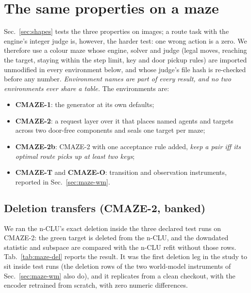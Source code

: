 \documentclass{article} %
\begin{document}
\section{The same properties on a maze}
\label{sec:maze}

Sec.~\ref{sec:shapes} tests the three properties on images; a route task with the engine's integer judge is, however, the harder test: one wrong action is a zero. We therefore use a colour maze whose engine, solver and judge (legal
moves, reaching the target, staying within the step limit, key and door pickup rules) are imported
unmodified in every environment below, and whose judge's file hash is re-checked before any
number. %
\emph{Environment names are part of every result, and no two environments ever share a
table.} The environments are:
\begin{itemize}[leftmargin=*,nosep]
\item \textbf{CMAZE-1}: the generator at its own defaults;
\item \textbf{CMAZE-2}: a request layer over it that places named agents and targets across two
  door-free components and seals one target per maze;
\item \textbf{CMAZE-2b}: CMAZE-2 with one acceptance rule added, \emph{keep a pair iff its
  optimal route picks up at least two keys};
\item \textbf{CMAZE-T} and \textbf{CMAZE-O}: transition and observation instruments, reported in Sec.~\ref{sec:maze-wm}.
\end{itemize}

\subsection{Deletion transfers (CMAZE-2, banked)}
\label{sec:maze-del}

We ran the n-CLU's exact deletion inside the three declared test runs on CMAZE-2: the
green target is deleted from the n-CLU, and the downdated statistic and subspace are compared
with the n-CLU refit without those rows. Tab.~\ref{tab:maze-del} reports the result. It was the
first deletion leg in the study to sit inside test runs (the deletion rows of the two
world-model instruments of Sec.~\ref{sec:maze-wm} also do), and it replicates from a clean
checkout, with the encoder retrained from scratch, with zero numeric differences.
\end{document}
